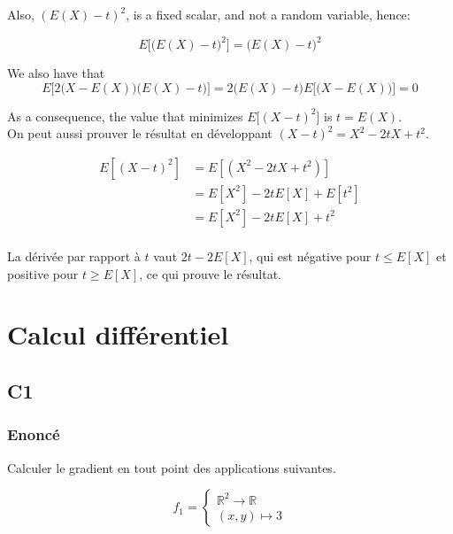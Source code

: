 \documentclass[
10pt, %
a4paper, %
oneside, %
headinclude,footinclude, %
BCOR5mm, %
]{scrartcl}
\begin{document}
Also,  $(E(X)-t)^2$, is a fixed scalar, and not a random variable, hence:

\begin{equation*}
    E\Big[\big(E(X)-t\big)^2\Big]=\big(E(X)-t\big)^2
\end{equation*}

We also have that
\begin{equation*}
    E\Big[2\big(X-E(X)\big)\big(E(X)-t\big)\Big]=2\big(E(X)-t\big)E\Big[\big(X-E(X)\big)\Big]=0
\end{equation*}

As a consequence, the value that minimizes $E\big[(X-t)^2 \big]$ is $t=E(X)$.
\\

On peut aussi prouver le résultat en développant $(X-t)^2=X^2-2tX+t^2$.

\begin{equation}
\begin{aligned}
    \label{eq:}
    E[(X-t)^2]  &= E[(X^2-2tX+t^2)]\\
		&= E[X^2]-2tE[X] + E[t^2]\\
		&= E[X^2]-2tE[X] + t^2\\
\end{aligned}
\end{equation}

La dérivée par rapport à $t$ vaut $2t - 2E[X]$, qui est négative pour $t\leq E[X]$ et positive pour $t\geq E[X]$, ce qui prouve le résultat.



\section{\large\color{Blue}Calcul différentiel}

\subsection{\color{MidnightBlue}C1}

\subsubsection{Enoncé}
\label{par:enoncé}

Calculer le gradient en tout point des applications suivantes.

$$
f_1 = \left\{
    \begin{array}{ll}
        \mathbb{R}^2 \rightarrow \mathbb{R}  \\
	(x,y)\mapsto 3
    \end{array}
\right.
$$
\end{document}
